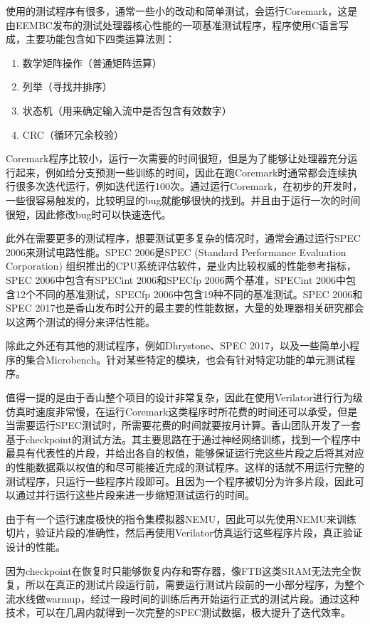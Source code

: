 使用的测试程序有很多，通常一些小的改动和简单测试，会运行Coremark，这是由EEMBC发布的测试处理器核心性能的一项基准测试程序，程序使用C语言写成，主要功能包含如下四类运算法则：

\begin{enumerate}
	\item 数学矩阵操作（普通矩阵运算）
	\item 列举（寻找并排序）
	\item 状态机（用来确定输入流中是否包含有效数字）
	\item CRC（循环冗余校验）
\end{enumerate}

Coremark程序比较小，运行一次需要的时间很短，但是为了能够让处理器充分运行起来，例如给分支预测一些训练的时间，因此在跑Coremark时通常都会连续执行很多次迭代运行，例如迭代运行100次。通过运行Coremark，在初步的开发时，一些很容易触发的，比较明显的bug就能够很快的找到。并且由于运行一次的时间很短，因此修改bug时可以快速迭代。

此外在需要更多的测试程序，想要测试更多复杂的情况时，通常会通过运行SPEC 2006\cite{spec-2006}来测试电路性能。SPEC 2006是SPEC (Standard Performance Evaluation Corporation) 组织推出的CPU系统评估软件，是业内比较权威的性能参考指标，SPEC 2006中包含有SPECint 2006和SPECfp 2006两个基准，SPECint 2006中包含12个不同的基准测试，SPECfp 2006中包含19种不同的基准测试。SPEC 2006和SPEC 2017也是香山发布时公开的最主要的性能数据，大量的处理器相关研究都会以这两个测试的得分来评估性能。

除此之外还有其他的测试程序，例如Dhrystone\cite{dhrystone}、SPEC 2017，以及一些简单小程序的集合Microbench。针对某些特定的模块，也会有针对特定功能的单元测试程序。


值得一提的是由于香山整个项目的设计非常复杂，因此在使用Verilator进行行为级仿真时速度非常慢，在运行Coremark这类程序时所花费的时间还可以承受，但是当需要运行SPEC测试时，所需要花费的时间就要按月计算。香山团队开发了一套基于checkpoint的测试方法。其主要思路在于通过神经网络训练，找到一个程序中最具有代表性的片段，并给出各自的权值，能够保证运行完这些片段之后将其对应的性能数据乘以权值的和尽可能接近完成的测试程序。这样的话就不用运行完整的测试程序，只运行一些程序片段即可。且因为一个程序被切分为许多片段，因此可以通过并行运行这些片段来进一步缩短测试运行的时间。

由于有一个运行速度极快的指令集模拟器NEMU，因此可以先使用NEMU来训练切片，验证片段的准确性，然后再使用Verilator仿真运行这些程序片段，真正验证设计的性能。

因为checkpoint在恢复时只能够恢复内存和寄存器，像FTB这类SRAM无法完全恢复，所以在真正的测试片段运行前，需要运行测试片段前的一小部分程序，为整个流水线做warmup，经过一段时间的训练后再开始运行正式的测试片段。通过这种技术，可以在几周内就得到一次完整的SPEC测试数据，极大提升了迭代效率。

